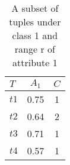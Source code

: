 \begin{table}[h]
\caption{A subset of tuples under class 1 and range r of attribute 1}
\label{table:table2_3}
\centering
\begin{tabular}{lcc}
	\toprule
	\textbf{$\mathit{T}$} & \textbf{$\mathit{A_1}$}   & \textbf{$\mathit{C}$} \\
	\midrule
	$\mathit{t1}$ & 0.75 & 1 \\
	$\mathit{t2}$ & 0.64 & 2 \\
	$\mathit{t3}$ & 0.71 & 1 \\
	$\mathit{t4}$ & 0.57 & 1 \\
	\bottomrule
\end{tabular} 
\end{table}
